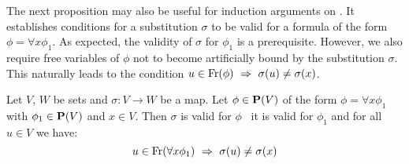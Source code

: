 The next proposition may also be useful for induction arguments on
\pv. It establishes conditions for a substitution $\sigma$ to be
valid for a formula of the form $\phi=\forall x\phi_{1}$. As
expected, the validity of $\sigma$ for $\phi_{1}$ is a prerequisite.
However, we also require free variables of $\phi$ not to become
artificially bound by the substitution $\sigma$. This naturally
leads to the condition $u\in\mbox{\rm Fr}(\phi)\ \Rightarrow\
\sigma(u)\neq\sigma(x)$.

\begin{prop}\label{logic:prop:FOPL:valid:recursion:quant}
    Let $V$, $W$ be sets and $\sigma:V\to W$ be a map. Let $\phi\in\mbox{${\bf P}(V)$}$ 
    of the form $\phi=\forall x\phi_{1}$ with $\phi_{1}\in\mbox{${\bf P}(V)$}$ and $x\in V$. 
    Then $\sigma$ is valid for $\phi$ \ifand\ it is valid for $\phi_{1}$ 
    and for all $u\in V$ we have:
    \[
        u\in\free(\forall x\phi_{1})\ \Rightarrow\ \sigma(u)\neq\sigma(x)
    \]
\end{prop}
